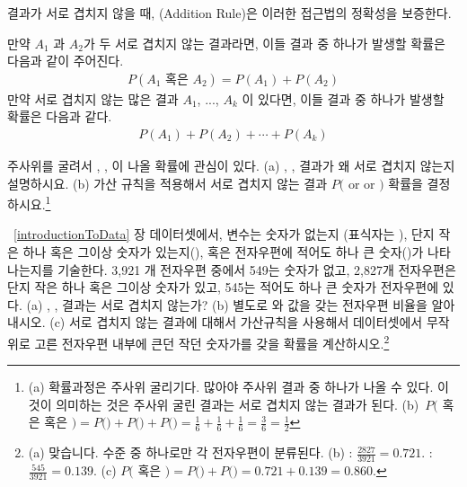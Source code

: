 결과가 서로 겹치지 않을 때, (Addition Rule)은 이러한 접근법의 정확성을 보증한다.

\begin{termBox}{
만약 $A_1$ 과 $A_2$가 두 서로 겹치지 않는 결과라면, 이들 결과 중 하나가 발생할 확률은 다음과 같이 주어진다.
\begin{eqnarray*}
P(A_1\text{ 혹은 } A_2) = P(A_1) + P(A_2)
\end{eqnarray*}
만약 서로 겹치지 않는 많은 결과 $A_1$, ..., $A_k$ 이 있다면, 이들 결과 중 하나가 발생할 확률은 다음과 같다.
\begin{eqnarray}
P(A_1) + P(A_2) + \cdots + P(A_k)
\end{eqnarray}
}
\end{termBox}

\begin{exercise}
주사위를 굴려서 , ,  이 나올 확률에 관심이 있다. (a) , ,  결과가 왜 서로 겹치지 않는지 설명하시요. (b) 가산 규칙을 적용해서 서로 겹치지 않는 결과 $P($ or  or $)$ 확률을 결정하시요.\footnote{(a) 확률과정은 주사위 굴리기다. 많아야 주사위 결과 중 하나가 나올 수 있다. 이것이 의미하는 것은 주사위 굴린 결과는 서로 겹치지 않는 결과가 된다. (b)~$P($ 혹은  혹은 $) = P($$)+P($$)+P($$) = \frac{1}{6} + \frac{1}{6} + \frac{1}{6} = \frac{3}{6} = \frac{1}{2}$}
\end{exercise}

\begin{exercise}
~\ref{introductionToData} 장  데이터셋에서,  변수는 숫자가 없는지 (표식자는 ), 단지 작은 하나 혹은 그이상 숫자가 있는지(), 혹은 전자우편에 적어도 하나 큰 숫자()가 나타나는지를 기술한다. 3,921 개 전자우편 중에서 549는 숫자가 없고, 2,827개 전자우편은 단지 작은 하나 혹은 그이상 숫자가 있고, 545는 적어도 하나 큰 숫자가 전자우편에 있다. (a) , ,  결과는 서로 겹치지 않는가? (b) 별도로  와  값을 갖는 전자우편 비율을 알아내시오. (c) 서로 겹치지 않는 결과에 대해서 가산규칙을 사용해서 데이터셋에서 무작위로 고른 전자우편 내부에 큰던 작던 숫자가를 갖을 확률을 계산하시오.\footnote{
(a) 맞습니다.  수준 중 하나로만 각 전자우편이 분류된다. (b) : $\frac{2827}{3921} = 0.721$. : $\frac{545}{3921} = 0.139$. (c) $P($ 혹은 $) = P($$) + P($$) = 0.721 + 0.139 = 0.860$.}
\end{exercise}

